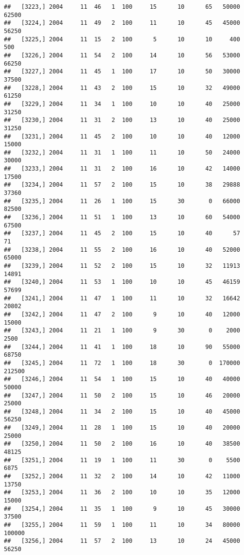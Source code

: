 \documentclass{article}\usepackage[]{graphicx}\usepackage[]{color}
\makeatletter
\newenvironment{kframe}{%
 \def\at@end@of@kframe{}%
 \ifinner\ifhmode%
  \def\at@end@of@kframe{\end{minipage}}%
  \begin{minipage}{\columnwidth}%
 \fi\fi%
 \def\FrameCommand##1{\hskip\@totalleftmargin \hskip-\fboxsep
 \colorbox{shadecolor}{##1}\hskip-\fboxsep
     \hskip-\linewidth \hskip-\@totalleftmargin \hskip\columnwidth}%
 \MakeFramed {\advance\hsize-\width
   \@totalleftmargin\z@ \linewidth\hsize
   \@setminipage}}%
 {\par\unskip\endMakeFramed%
 \at@end@of@kframe}
\newenvironment{knitrout}{}{} %
\makeatother
\begin{document}
\begin{knitrout}
\begin{kframe}
\begin{verbatim}
##   [3223,] 2004     11  46   1  100     15      10      65   50000   62500
##   [3224,] 2004     11  49   2  100     11      10      45   45000   56250
##   [3225,] 2004     11  15   2  100      5      10      10     400     500
##   [3226,] 2004     11  54   2  100     14      10      56   53000   66250
##   [3227,] 2004     11  45   1  100     17      10      50   30000   37500
##   [3228,] 2004     11  43   2  100     15      10      32   49000   61250
##   [3229,] 2004     11  34   1  100     10      10      40   25000   31250
##   [3230,] 2004     11  31   2  100     13      10      40   25000   31250
##   [3231,] 2004     11  45   2  100     10      10      40   12000   15000
##   [3232,] 2004     11  31   1  100     11      10      50   24000   30000
##   [3233,] 2004     11  31   2  100     16      10      42   14000   17500
##   [3234,] 2004     11  57   2  100     15      10      38   29888   37360
##   [3235,] 2004     11  26   1  100     15      30       0   66000   82500
##   [3236,] 2004     11  51   1  100     13      10      60   54000   67500
##   [3237,] 2004     11  45   2  100     15      10      40      57      71
##   [3238,] 2004     11  55   2  100     16      10      40   52000   65000
##   [3239,] 2004     11  52   2  100     15      10      32   11913   14891
##   [3240,] 2004     11  53   1  100     10      10      45   46159   57699
##   [3241,] 2004     11  47   1  100     11      10      32   16642   20802
##   [3242,] 2004     11  47   2  100      9      10      40   12000   15000
##   [3243,] 2004     11  21   1  100      9      30       0    2000    2500
##   [3244,] 2004     11  41   1  100     18      10      90   55000   68750
##   [3245,] 2004     11  72   1  100     18      30       0  170000  212500
##   [3246,] 2004     11  54   1  100     15      10      40   40000   50000
##   [3247,] 2004     11  50   2  100     15      10      46   20000   25000
##   [3248,] 2004     11  34   2  100     15      10      40   45000   56250
##   [3249,] 2004     11  28   1  100     15      10      40   20000   25000
##   [3250,] 2004     11  50   2  100     16      10      40   38500   48125
##   [3251,] 2004     11  19   1  100     11      30       0    5500    6875
##   [3252,] 2004     11  32   2  100     14      10      42   11000   13750
##   [3253,] 2004     11  36   2  100     10      10      35   12000   15000
##   [3254,] 2004     11  35   1  100      9      10      45   30000   37500
##   [3255,] 2004     11  59   1  100     11      10      34   80000  100000
##   [3256,] 2004     11  57   2  100     13      10      24   45000   56250

\end{verbatim}
\end{kframe}
\end{knitrout}
\end{document}
